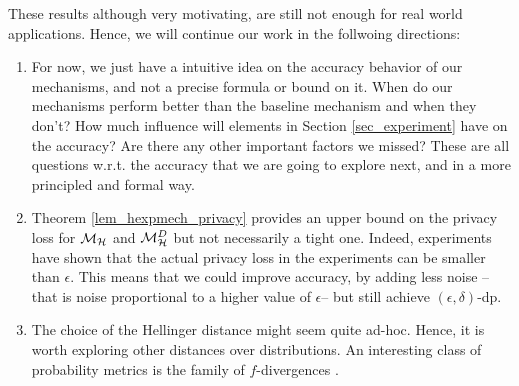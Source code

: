 \documentclass{article}
\begin{document}
These results although very motivating, are still not enough for real world applications. Hence, we will continue our work in the follwoing directions:
\begin{enumerate}
  \item  For now, we just have a intuitive idea on the accuracy
behavior of our mechanisms, and not a precise formula or bound on
it. When do our mechanisms perform better than the baseline mechanism
and when they don't? How much influence will elements in Section
\ref{sec_experiment} have on the accuracy? Are there any other
important factors we missed? These are all questions w.r.t. the
accuracy that we are going to explore next, and in a more principled
and formal way.
\item  Theorem \ref{lem_hexpmech_privacy} provides an upper bound on the
privacy loss for $\mathcal{M}_{\mathcal{H}}$ and $\mathcal{M}^{D}_{\mathcal{H}}$ but not necessarily a
tight one. Indeed, experiments have shown that the actual privacy loss
in the experiments can be smaller than $\epsilon$. This means that we
could improve accuracy, by adding less noise -- that is noise
proportional to a higher value of $\epsilon$-- but still achieve
$(\epsilon, \delta)$-dp.
\item The choice of the Hellinger distance might seem quite
ad-hoc. Hence, it is worth exploring other distances over
distributions. An interesting class of probability metrics is the
family of $f$-divergences \cite{CIT-004}.
\end{enumerate}




\end{document}
